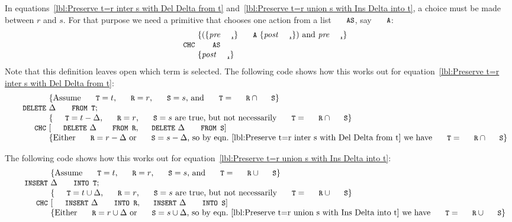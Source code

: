 \documentclass{svproc}
\begin{document}
	In equations~\ref{lbl:Preserve t=r inter s with Del Delta from t} and~\ref{lbl:Preserve t=r union s with Ins Delta into t},
	a choice must be made between $r$ and $s$. For that purpose we need a primitive  that chooses one action from a list $\code{AS}$, say $\code{A}$:
\[\begin{array}{r@{~}l}
&\{ (\{\id{pre}_{\code{\tiny A}}\}\ \code{A}\ \{\id{post}_{\code{\tiny A}}\})\text{ and } \id{pre}_{\code{\tiny A}} \}\\
\code{CHC}&\ \code{AS}\\
&\{\id{post}_{\code{\tiny A}}\}
\end{array}\]
	Note that this definition leaves open which term is selected.
	The following code shows how this works out for equation~\ref{lbl:Preserve t=r inter s with Del Delta from t}:
\[\begin{array}{r@{~}l}
&\{\text{Assume $\code{T}=t$, $\code{R}=r$, $\code{S}=s$, and $\code{T}=\code{R}\cap\code{S}$}\}\\
\code{DELETE}&\Delta\code{ FROM T};\\
&\{\text{$\code{T}=t-\Delta$, $\code{R}=r$, $\code{S}=s$ are true, but not necessarily $\code{T}=\code{R}\cap\code{S}$}\}\\
\code{CHC}&[\code{DELETE}\ \Delta\code{ FROM R},\code{DELETE}\ \Delta\code{ FROM S}]\\
&\{\text{Either }\code{R}=r-\Delta\text{ or }\code{S}=s-\Delta\text{, so by eqn.~\ref{lbl:Preserve t=r inter s with Del Delta from t} we have }\code{T}=\code{R}\cap\code{S}\}
\end{array}\]

	The following code shows how this works out for equation~\ref{lbl:Preserve t=r union s with Ins Delta into t}:
\[\begin{array}{r@{~}l}
&\{\text{Assume $\code{T}=t$, $\code{R}=r$, $\code{S}=s$, and $\code{T}=\code{R}\cup\code{S}$}\}\\
\code{INSERT}&\Delta\code{ INTO T};\\
&\{\text{$\code{T}=t\cup\Delta$, $\code{R}=r$, $\code{S}=s$ are true, but not necessarily $\code{T}=\code{R}\cup\code{S}$}\}\\
\code{CHC}&[\code{INSERT}\ \Delta\code{ INTO R},\code{INSERT}\ \Delta\code{ INTO S}]\\
&\{\text{Either }\code{R}=r\cup\Delta\text{ or }\code{S}=s\cup\Delta\text{, so by eqn.~\ref{lbl:Preserve t=r union s with Ins Delta into t} we have }\code{T}=\code{R}\cup\code{S}\}
\end{array}\]
\end{document}
